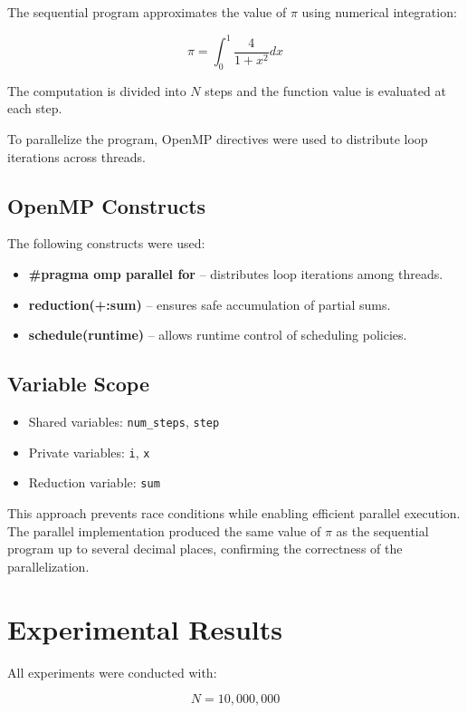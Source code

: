 \documentclass[conference]{IEEEtran}
\begin{document}
The sequential program approximates the value of $\pi$ using numerical integration:

\[
\pi = \int_0^1 \frac{4}{1+x^2} dx
\]

The computation is divided into $N$ steps and the function value is evaluated at each step.

To parallelize the program, OpenMP directives were used to distribute loop iterations across threads.

\subsection{OpenMP Constructs}

The following constructs were used:

\begin{itemize}
\item \textbf{\#pragma omp parallel for} – distributes loop iterations among threads.
\item \textbf{reduction(+:sum)} – ensures safe accumulation of partial sums.
\item \textbf{schedule(runtime)} – allows runtime control of scheduling policies.
\end{itemize}

\subsection{Variable Scope}

\begin{itemize}
\item Shared variables: \texttt{num\_steps}, \texttt{step}
\item Private variables: \texttt{i}, \texttt{x}
\item Reduction variable: \texttt{sum}
\end{itemize}

This approach prevents race conditions while enabling efficient parallel execution.  
The parallel implementation produced the same value of $\pi$ as the sequential program up to several decimal places, confirming the correctness of the parallelization.

\section{Experimental Results}

All experiments were conducted with:

\[
N = 10,000,000
\]
\end{document}
